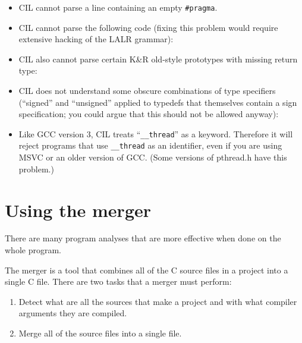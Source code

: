 \documentclass{article}
\def\t#1{{\tt #1}}
\begin{document}
\begin{itemize}
\item CIL cannot parse a line containing an empty \t{\#pragma}.

\item CIL cannot parse the following code (fixing this problem would require
extensive hacking of the LALR grammar):

\item CIL also cannot parse certain K\&R old-style prototypes with missing
return type:

\item CIL does not understand some obscure combinations of type specifiers
(``signed'' and ``unsigned'' applied to typedefs that themselves contain a
sign specification; you could argue that this should not be allowed anyway):

\item Like 
{GCC version 3}, CIL treats ``\t{\_\_thread}'' as a keyword.
Therefore it will reject programs that use \t{\_\_thread} as an
identifier, even if you are using MSVC or an older version of GCC.
(Some versions of pthread.h have this problem.)

\end{itemize}

  \section{Using the merger}\label{sec-merger}

 There are many program analyses that are more effective when
done on the whole program.

 The merger is a tool that combines all of the C source files in a project
into a single C file. There are two tasks that a merger must perform:
\begin{enumerate}
\item Detect what are all the sources that make a project and with what
compiler arguments they are compiled.

\item Merge all of the source files into a single file. 
\end{enumerate}
\end{document}
